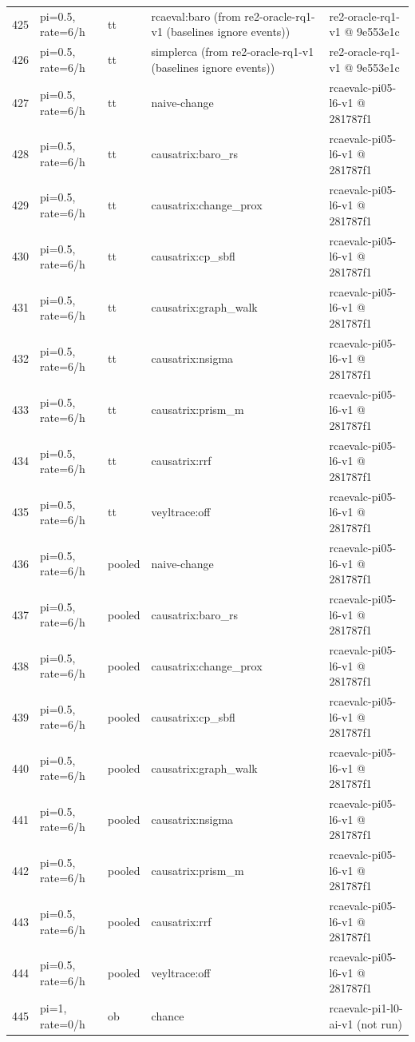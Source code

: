 \begin{longtable}{@{}r>{\raggedright\arraybackslash}p{48.0pt}>{\raggedright\arraybackslash}p{18.0pt}>{\raggedright\arraybackslash}p{108.0pt}>{\raggedright\arraybackslash}p{105.0pt}@{}}
425 & pi=0.5, rate=6/h & tt & rcaeval:baro (from re2-oracle-rq1-v1 (baselines ignore events)) & re2-oracle-rq1-v1 @ 9e553e1c \\
426 & pi=0.5, rate=6/h & tt & simplerca (from re2-oracle-rq1-v1 (baselines ignore events)) & re2-oracle-rq1-v1 @ 9e553e1c \\
427 & pi=0.5, rate=6/h & tt & naive-change & rcaevalc-pi05-l6-v1 @ 281787f1 \\
428 & pi=0.5, rate=6/h & tt & causatrix:baro\_rs & rcaevalc-pi05-l6-v1 @ 281787f1 \\
429 & pi=0.5, rate=6/h & tt & causatrix:change\_prox & rcaevalc-pi05-l6-v1 @ 281787f1 \\
430 & pi=0.5, rate=6/h & tt & causatrix:cp\_sbfl & rcaevalc-pi05-l6-v1 @ 281787f1 \\
431 & pi=0.5, rate=6/h & tt & causatrix:graph\_walk & rcaevalc-pi05-l6-v1 @ 281787f1 \\
432 & pi=0.5, rate=6/h & tt & causatrix:nsigma & rcaevalc-pi05-l6-v1 @ 281787f1 \\
433 & pi=0.5, rate=6/h & tt & causatrix:prism\_m & rcaevalc-pi05-l6-v1 @ 281787f1 \\
434 & pi=0.5, rate=6/h & tt & causatrix:rrf & rcaevalc-pi05-l6-v1 @ 281787f1 \\
435 & pi=0.5, rate=6/h & tt & veyltrace:off & rcaevalc-pi05-l6-v1 @ 281787f1 \\
436 & pi=0.5, rate=6/h & pooled & naive-change & rcaevalc-pi05-l6-v1 @ 281787f1 \\
437 & pi=0.5, rate=6/h & pooled & causatrix:baro\_rs & rcaevalc-pi05-l6-v1 @ 281787f1 \\
438 & pi=0.5, rate=6/h & pooled & causatrix:change\_prox & rcaevalc-pi05-l6-v1 @ 281787f1 \\
439 & pi=0.5, rate=6/h & pooled & causatrix:cp\_sbfl & rcaevalc-pi05-l6-v1 @ 281787f1 \\
440 & pi=0.5, rate=6/h & pooled & causatrix:graph\_walk & rcaevalc-pi05-l6-v1 @ 281787f1 \\
441 & pi=0.5, rate=6/h & pooled & causatrix:nsigma & rcaevalc-pi05-l6-v1 @ 281787f1 \\
442 & pi=0.5, rate=6/h & pooled & causatrix:prism\_m & rcaevalc-pi05-l6-v1 @ 281787f1 \\
443 & pi=0.5, rate=6/h & pooled & causatrix:rrf & rcaevalc-pi05-l6-v1 @ 281787f1 \\
444 & pi=0.5, rate=6/h & pooled & veyltrace:off & rcaevalc-pi05-l6-v1 @ 281787f1 \\
445 & pi=1, rate=0/h & ob & chance & rcaevalc-pi1-l0-ai-v1 (not run) \\

\end{longtable}

